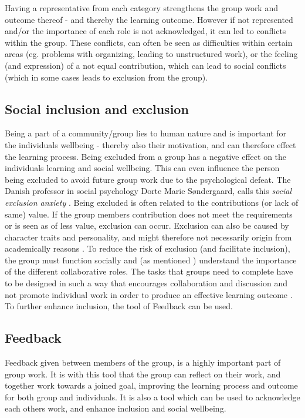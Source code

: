 Having a representative from each category strengthens the group work and outcome thereof - and thereby the learning outcome\cite{ProjektarbejdesKompleksitet}. However if not represented and/or the importance of each role is not acknowledged, it can led to conflicts within the group. These conflicts, can often be seen as difficulties within certain areas (eg. problems with organizing, leading to unstructured work), or the feeling (and expression) of a not equal contribution, which can lead to social conflicts (which in some cases leads to exclusion from the group)\cite{ProjektarbejdesKompleksitet}. 

\subsection{Social inclusion and exclusion}
Being a part of a community/group lies to human nature and is important for the individuals wellbeing  \cite{ProjektarbejdesKompleksitet}- thereby also their motivation, and can therefore effect the learning process. Being excluded from a group has a negative effect on the individuals learning and social wellbeing. This can even influence the person being excluded to avoid future group work due to the psychological defeat. The Danish professor in social psychology Dorte Marie Søndergaard, calls this \textit{social exclusion anxiety} \cite{ProjektarbejdesKompleksitet}. Being excluded is often related to the contributions (or lack of same) value. If the group members contribution does not meet the requirements or is seen as of less value, exclusion can occur. Exclusion can also be caused by character traits and personality, and might therefore not necessarily origin from academically reasons \cite{ProjektarbejdesKompleksitet}.
To reduce the risk of exclusion (and facilitate inclusion), the group must function socially and (as mentioned ) understand the importance of the different collaborative roles. The tasks that groups need to complete have to be designed in such a way that encourages collaboration and discussion and not promote individual work in order to produce an effective learning outcome \cite{collaborationSocialPedagogy}. To further enhance inclusion, the tool of Feedback can be used. 


\subsection{Feedback}
Feedback given between members of the group, is a highly important part of group work\cite{laeringIPraksis}\cite{ProjektarbejdesKompleksitet}. It is with this tool that the group can reflect on their work, and together work towards a joined goal, improving the learning process and outcome for both group and individuals\cite{laeringIPraksis}\cite{ProjektarbejdesKompleksitet}. It is also a tool which can be used to acknowledge each others work, and enhance inclusion and social wellbeing\cite{laeringIPraksis}\cite{ProjektarbejdesKompleksitet}. 


